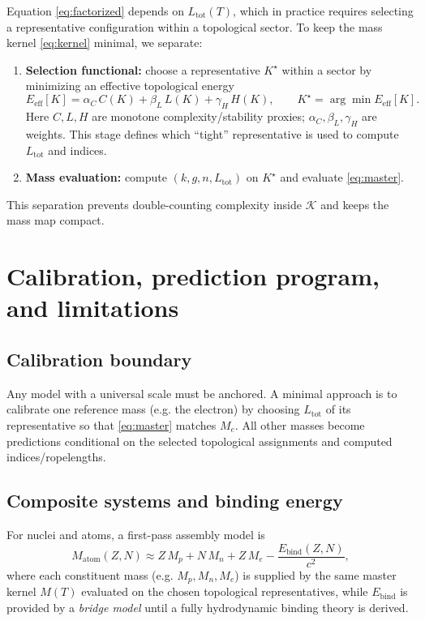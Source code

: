 \documentclass[11pt]{article}
\theoremstyle{definition}
\theoremstyle{plain}
\theoremstyle{remark}
\begin{document}
        Equation \eqref{eq:factorized} depends on $L_{\mathrm{tot}}(T)$, which in practice requires selecting a representative configuration within a topological sector. To keep the mass kernel \eqref{eq:kernel} minimal, we separate:
        \begin{enumerate}
            \item \textbf{Selection functional:} choose a representative $K^\star$ within a sector by minimizing an effective topological energy
            \begin{equation}
                E_{\mathrm{eff}}[K]=\alpha_C\,C(K)+\beta_L\,L(K)+\gamma_H\,H(K),
                \qquad
                K^\star=\arg\min E_{\mathrm{eff}}[K].
                \label{eq:Eeff}
            \end{equation}
            Here $C,L,H$ are monotone complexity/stability proxies; $\alpha_C,\beta_L,\gamma_H$ are weights. This stage defines which ``tight'' representative is used to compute $L_{\mathrm{tot}}$ and indices.
            \item \textbf{Mass evaluation:} compute $(k,g,n,L_{\mathrm{tot}})$ on $K^\star$ and evaluate \eqref{eq:master}.
        \end{enumerate}
        This separation prevents double-counting complexity inside $\mathcal{K}$ and keeps the mass map compact.

        \section{Calibration, prediction program, and limitations}

        \subsection{Calibration boundary}
            Any model with a universal scale must be anchored. A minimal approach is to calibrate one reference mass (e.g. the electron) by choosing $L_{\mathrm{tot}}$ of its representative so that \eqref{eq:master} matches $M_e$. All other masses become predictions conditional on the selected topological assignments and computed indices/ropelengths.

        \subsection{Composite systems and binding energy}
            For nuclei and atoms, a first-pass assembly model is
            \begin{equation}
                M_{\mathrm{atom}}(Z,N)\approx Z\,M_p + N\,M_n + Z\,M_e - \frac{E_{\mathrm{bind}}(Z,N)}{c^2},
            \end{equation}
            where each constituent mass (e.g. \(M_p,M_n,M_e\)) is supplied by the same master kernel \(M(T)\) evaluated on the chosen topological representatives, while \(E_{\mathrm{bind}}\) is provided by a \emph{bridge model} until a fully hydrodynamic binding theory is derived.
\end{document}
